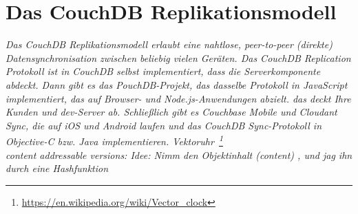   \section{Das CouchDB Replikationsmodell}
  \it{Das CouchDB Replikationsmodell erlaubt eine nahtlose, peer-to-peer (direkte) Datensynchronisation zwischen beliebig vielen Geräten. Das CouchDB Replication Protokoll ist in CouchDB selbst implementiert, dass die Serverkomponente abdeckt. Dann gibt es das PouchDB-Projekt, das dasselbe Protokoll in JavaScript implementiert, das auf Browser- und Node.js-Anwendungen abzielt. das deckt Ihre Kunden und dev-Server ab. Schließlich gibt es Couchbase Mobile und Cloudant Sync, die auf iOS und Android laufen und das CouchDB Sync-Protokoll in Objective-C bzw. Java implementieren.}
  Vektoruhr~\footnote{\url{https://en.wikipedia.org/wiki/Vector_clock}} \\
  content addressable versions: Idee: Nimm den Objektinhalt (content) ,  und jag ihn durch eine \gls{Hashfunktion}\\
%
%

